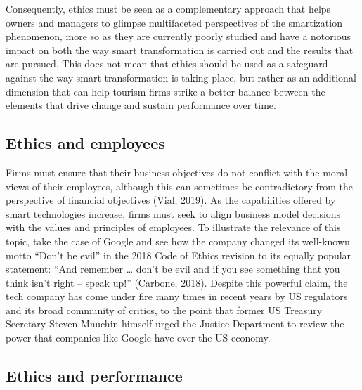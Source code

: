 \documentclass[
  letterpaper,
  DIV=11,
  numbers=noendperiod]{scrreprt}
\begin{document}
Consequently, ethics must be seen as a complementary approach that helps
owners and managers to glimpse multifaceted perspectives of the
smartization phenomenon, more so as they are currently poorly studied
and have a notorious impact on both the way smart transformation is
carried out and the results that are pursued. This does not mean that
ethics should be used as a safeguard against the way smart
transformation is taking place, but rather as an additional dimension
that can help tourism firms strike a better balance between the elements
that drive change and sustain performance over time.

\hypertarget{ethics-and-employees}{%
\subsection{Ethics and employees}\label{ethics-and-employees}}

Firms must ensure that their business objectives do not conflict with
the moral views of their employees, although this can sometimes be
contradictory from the perspective of financial objectives (Vial, 2019).
As the capabilities offered by smart technologies increase, firms must
seek to align business model decisions with the values and principles of
employees. To illustrate the relevance of this topic, take the case of
Google and see how the company changed its well-known motto ``Don't be
evil'' in the 2018 Code of Ethics revision to its equally popular
statement: ``And remember \ldots{} don't be evil and if you see
something that you think isn't right -- speak up!'' (Carbone, 2018).
Despite this powerful claim, the tech company has come under fire many
times in recent years by US regulators and its broad community of
critics, to the point that former US Treasury Secretary Steven Mnuchin
himself urged the Justice Department to review the power that companies
like Google have over the US economy.

\hypertarget{ethics-and-performance}{%
\subsection{Ethics and performance}\label{ethics-and-performance}}
\end{document}
